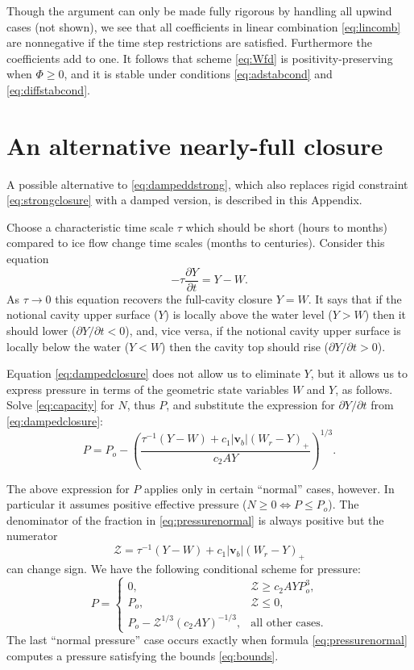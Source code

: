 \documentclass[11pt,final]{amsart}%
\newcommand\bv{\mathbf{v}}
\begin{document}
Though the argument can only be made fully rigorous by handling all upwind cases (not shown), we see that all coefficients in linear combination \eqref{eq:lincomb} are nonnegative if the time step restrictions are satisfied.  Furthermore the coefficients add to one.  It follows \citep{MortonMayers} that scheme \eqref{eq:Wfd} is positivity-preserving when $\Phi\ge 0$, and it is stable under conditions \eqref{eq:adstabcond} and \eqref{eq:diffstabcond}.


\section{An alternative nearly-full closure}

A possible alternative to \eqref{eq:dampeddstrong}, which also replaces rigid constraint \eqref{eq:strongclosure} with a damped version, is described in this Appendix.

Choose a characteristic time scale $\tau$ which should be short (hours to months) compared to ice flow change time scales (months to centuries).  Consider this equation
\begin{equation}
- \tau \frac{\partial Y}{\partial t} = Y - W. \label{eq:dampedclosure}
\end{equation}
As $\tau \to 0$ this equation recovers the full-cavity closure $Y=W$.  It says that if the notional cavity upper surface ($Y$) is locally above the water level ($Y>W$) then it should lower ($\partial Y/\partial t < 0$), and, vice versa, if the notional cavity upper surface is locally below the water ($Y<W$) then the cavity top should rise ($\partial Y/\partial t > 0$).

Equation \eqref{eq:dampedclosure} does not allow us to eliminate $Y$, but it allows us to express pressure in terms of the geometric state variables $W$ and $Y$, as follows.  Solve \eqref{eq:capacity} for $N$, thus $P$, and substitute the expression for $\partial Y/\partial t$ from \eqref{eq:dampedclosure}:
\begin{equation}
P = P_o - \left(\frac{\tau^{-1} (Y-W) + c_1 |\bv_b| (W_r - Y)_+}{c_2 A Y}\right)^{1/3}.  \label{eq:pressurenormal}
\end{equation}

The above expression for $P$ applies only in certain ``normal'' cases, however.  In particular it assumes positive effective pressure ($N\ge 0 \iff P \le P_o$). The denominator of the fraction in \eqref{eq:pressurenormal} is always positive but the numerator
   $$\mathcal{Z} = \tau^{-1} (Y-W) + c_1 |\bv_b| (W_r - Y)_+$$
can change sign.  We have the following conditional scheme for pressure:
\begin{equation}
P = \begin{cases}
0, & \mathcal{Z} \ge c_2 A Y P_o^3, \\
P_o, & \mathcal{Z} \le 0, \\
P_o - \mathcal{Z}^{1/3} (c_2 A Y)^{-1/3}, & \text{all other cases}.
\end{cases} \label{eq:pressureWY}
\end{equation}
The last ``normal pressure'' case occurs exactly when formula \eqref{eq:pressurenormal} computes a pressure satisfying the bounds \eqref{eq:bounds}.
\end{document}
